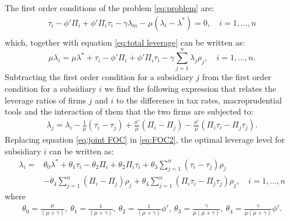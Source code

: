 \documentclass[12pt]{article}
\begin{document}
	The first order conditions of the problem \ref{eq:problem} are:
	\begin{equation}
	\begin{aligned}
	\tau_i-\phi'\Pi_i+\phi'\Pi_i\tau_{i}-\gamma\lambda_m-\mu(\lambda_i-\lambda^*)=0, \quad i=1,...,n\\
	\end{aligned}
	\label{eq:FOC}
	\end{equation}
	which, together with equation \ref{eq:total leverage} can be written as:  
	\begin{equation}
	\mu\lambda_i=\mu\lambda^*+\tau_{i}-\phi'\Pi_i+\phi'\Pi_i\tau_{i}-\gamma \sum_{j=1}^{n}\lambda_j\rho_j, \quad i=1,...,n.
	\label{eq:FOC2}
	\end{equation}
	Subtracting the first order condition for a subsidiary $j$ from the first order condition for a subsidiary $i$ we find the following expression that relates the leverage ratios of firms $j$ and $i$ to the difference in tax rates, macroprudential tools and the interaction of them that the two firms are subjected to:
	\begin{equation}
	\begin{aligned}
	\lambda_j=\lambda_i-\frac{1}{\mu}(\tau_i-\tau_j)+\frac{\phi'}{\mu}(\Pi_i-\Pi_j)-\frac{\phi'}{\mu}(\Pi_i\tau_i-\Pi_j\tau_j).
	\end{aligned}
	\label{eq:joint FOC}
	\end{equation}
	Replacing equation \ref{eq:joint FOC} in \ref{eq:FOC2}, the optimal leverage level for subsidiary $i$ can be written as:  
	\begin{equation}
	\begin{aligned}
	\lambda_i=&\theta_0\lambda^*+\theta_1\tau_i-\theta_2\Pi_i+\theta_2\Pi_i\tau_{i}+\theta_3\sum_{j=1}^{n}(\tau_i-\tau_j)\rho_j\\
	&-\theta_4\sum_{j=1}^{n}(\Pi_i-\Pi_j)\rho_j+\theta_4\sum_{j=1}^{n}(\Pi_i\tau_i-\Pi_j\tau_j)\rho_j, \quad i=1,...,n
	\end{aligned}
	\label{eq:optimal leverage in theory}
	\end{equation}
	where
	\begin{equation*}
	\begin{aligned}
	 \theta_0=\frac{\mu}{(\mu+\gamma)}, \ \theta_1=\frac{1}{(\mu+\gamma)}, \
	\theta_2=\frac{1}{(\mu+\gamma)}\phi', \
	\theta_3=\frac{\gamma}{\mu(\mu+\gamma)}, \
	\theta_4=\frac{\gamma}{\mu(\mu+\gamma)}\phi'.
	\end{aligned}
	\end{equation*}
	
\end{document}
